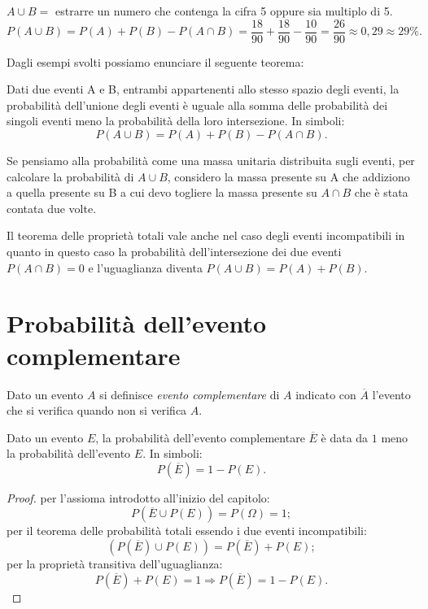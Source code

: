 \begin{exrig}
\begin{esempio}
$A\cup B =$ estrarre un numero che contenga la cifra 5 oppure sia multiplo di 5. 
\[ P(A\cup B)=P(A)+P(B)-P(A\cap 
B)=\frac{18}{90}+\frac{18}{90}-\frac{10}{90}=\frac{26}{90}\approx 0,29\approx 
29\%. \]
\end{esempio}
\end{exrig}

Dagli esempi svolti possiamo enunciare il seguente teorema:

\begin{teorema}
Dati due eventi A e B, entrambi appartenenti allo stesso spazio degli eventi, la 
probabilità dell'unione degli eventi è uguale alla somma delle probabilità dei 
singoli eventi meno la probabilità della loro intersezione.
In simboli: \[ P(A\cup B)=P(A)+P(B)-P(A\cap B). \]
\end{teorema}
Se pensiamo alla probabilità come una massa unitaria distribuita sugli eventi, 
per calcolare la probabilità di $A\cup B$, considero la massa presente su A che 
addiziono a quella presente su B a cui devo togliere la massa presente su $A\cap 
B$ che è stata contata due volte.

\osservazione Il teorema delle proprietà totali vale anche nel caso degli eventi 
incompatibili in quanto in questo caso la probabilità dell'intersezione dei due 
eventi $P(A\cap B)=0$ e l'uguaglianza diventa $P(A\cup B)=P(A)+P(B)$.


\section{Probabilità dell'evento complementare}
\label{sec:09_complementare}

Dato un evento $A$ si definisce \emph{evento complementare} di $A$ indicato con 
$\overline A$ l'evento che si verifica quando non si verifica $A$.
\begin{teorema}
Dato un evento $E$, la probabilità dell'evento complementare $\overline E$ è 
data da $1$ meno la probabilità dell'evento $E$. In simboli: \[ P(\overline 
E)=1-P(E). \]
\end{teorema}
\begin{proof} per l'assioma introdotto all'inizio del capitolo: \[ P(\overline 
E\cup P(E))=P(\Omega )=1; \]
per il teorema delle probabilità totali essendo i due eventi incompatibili: \[ 
(P(\overline E)\cup P(E))=P(\overline E)+P(E); \]
per la proprietà transitiva dell'uguaglianza: \[ P(\overline E)+P(E)=1 
\Rightarrow P(\overline E)=1-P(E). \]
\end{proof}

